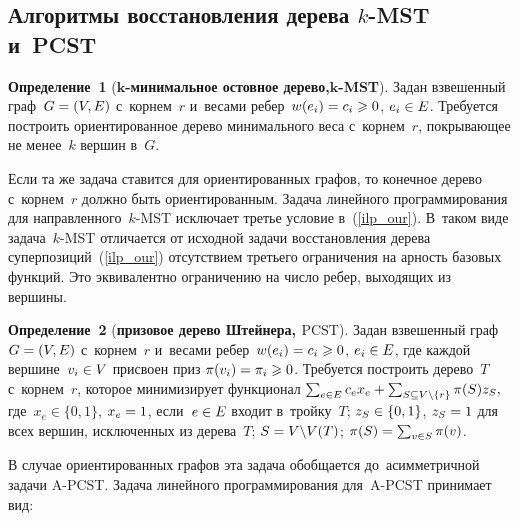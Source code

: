 \begin{multicols}{2}
\section{Алгоритмы восстановления дерева $k$-MST и~PCST}

\vspace*{-3pt}

\noindent
\textbf{Определение~1} (\textbf{$\bm{k}$-минимальное остовное дерево,\linebreak $\bm{k}$-MST}).
Задан взвешенный граф~$G\hm=(V,E)$ с~корнем~$r$ и~весами ребер~$w(e_i)\hm=c_i\hm\geqslant 
0$, $e_i\hm\in E$. Требуется построить ориентированное дерево минимального веса 
с~корнем~$r$, покрывающее не менее~$k$ вершин в~$G$.

\smallskip

Если та же задача ставится для ориентированных графов, то конечное дерево 
с~корнем~$r$ должно быть ориентированным. Задача линейного программирования для 
направленного~$k$-MST исключает \mbox{третье} условие в~(\ref{ilp_our}).
В~таком виде задача~$k$-MST отличается от исходной задачи восстановления 
дерева суперпозиций~(\ref{ilp_our}) отсутствием третьего ограничения на арность 
базовых функций. Это эквивалентно ограничению на число ребер, выходящих из 
вершины.

\smallskip

\noindent
\textbf{Определение~2} (\textbf{призовое дерево Штейнера, $\text{PCST}$}).\linebreak
Задан взвешенный граф $G\hm=(V,E)$ с~корнем~$r$ и~весами ребер~$w(e_i)\hm=c_i\hm\geqslant  0$, $e_i\hm\in E$, где каждой вершине~$v_i \hm\in V$ присвоен 
{приз} $\pi(v_i)\hm=\pi_i\geqslant 0$. Требуется построить дерево~$T$ с~корнем~$r$, 
которое \mbox{минимизирует} функционал
$\sum\nolimits_{e\in E}c_ex_e \hm+ \sum\nolimits_{S\subseteq V\backslash\{r\}} 
\pi(S)z_S,$
где~$x_e\in\{0, 1\}$, $x_e\hm=1$, если~$e\hm\in E$ входит в~тройку~$T$; $z_S\hm\in\{0, 1\}$, 
$z_S\hm=1$ для всех вершин, исключенных из дерева~$T$; $S \hm= V\backslash V(T)$; $\pi(S)\hm= \sum\nolimits_{v\in S}\pi(v)$.

\smallskip

В случае ориентированных графов эта задача обобщается до~асимметричной задачи 
A-PCST. Задача линейного программирования для~A-PCST принимает вид:

\vspace*{-4pt}


\end{multicols}
